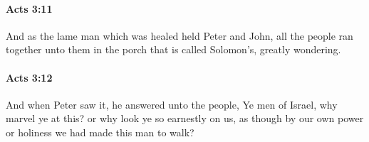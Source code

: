 		\paragraph{Acts 3:11} %
			\label{ACTS-3-11}

			And as the lame man which was healed held Peter and John, all the people ran together unto them in the porch that is called Solomon's, greatly wondering.

			\begin{framed}
			\scriptsize
				\begin{compactdesc}
					\item[SBLG] 
				\end{compactdesc}
			\end{framed}

		\paragraph{Acts 3:12} %
			\label{ACTS-3-12}

			And when Peter saw it, he answered unto the people, Ye men of Israel, why marvel ye at this?  or why look ye so earnestly on us, as though by our own power or holiness we had made this man to walk?

